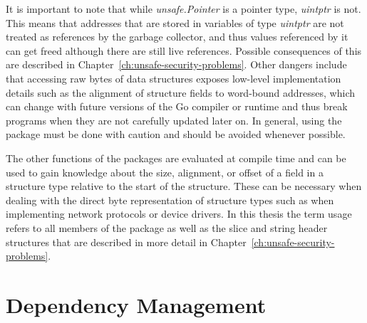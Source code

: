 

It is important to note that while \textit{unsafe.Pointer} is a pointer type, \textit{uintptr} is not.
This means that addresses that are stored in variables of type \textit{uintptr} are not treated as references by the
garbage collector, and thus values referenced by it can get freed although there are still live references.
Possible consequences of this are described in Chapter~\ref{ch:unsafe-security-problems}.
Other dangers include that accessing raw bytes of data structures exposes low-level implementation details such as
the alignment of structure fields to word-bound addresses, which can change with future versions of the Go compiler or
runtime and thus break programs when they are not carefully updated later on.
In general, using the \unsafe{} package must be done with caution and should be avoided whenever possible.

The other functions of the \unsafe{} packages are evaluated at compile time and can be used to gain knowledge about
the size, alignment, or offset of a field in a structure type relative to the start of the structure.
These can be necessary when dealing with the direct byte representation of structure types such as when implementing
network protocols or device drivers.
In this thesis the term \unsafe{} usage refers to all members of the \unsafe{} package as well as the slice and string
header structures that are described in more detail in Chapter~\ref{ch:unsafe-security-problems}.



\section{Dependency Management}\label{sec:background:dependencies}

